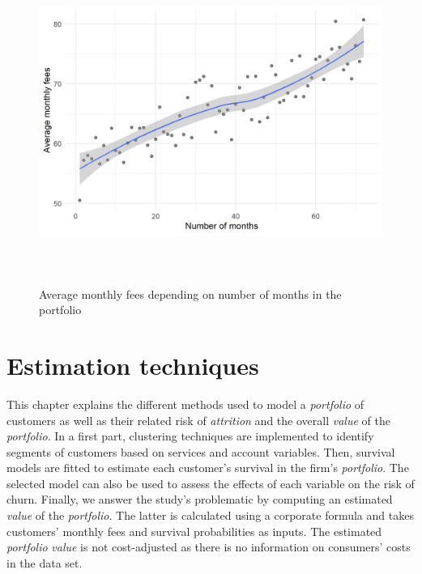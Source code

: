 \documentclass[
]{book}
\begin{document}
\begin{figure}

{\centering \includegraphics[width=450pt,height=300pt]{./imgs/monthly_charges_dur} 

}

\caption{Average monthly fees depending on number of months in the portfolio}\label{fig:monthlychargesdur}
\end{figure}

\hypertarget{estimation}{%
\chapter{Estimation techniques}\label{estimation}}

This chapter explains the different methods used to model a \emph{portfolio} of customers as well as their related risk of \emph{attrition} and the overall \emph{value} of the \emph{portfolio}. In a first part, clustering techniques are implemented to identify segments of customers based on services and account variables. Then, survival models are fitted to estimate each customer's survival in the firm's \emph{portfolio}. The selected model can also be used to assess the effects of each variable on the risk of churn. Finally, we answer the study's problematic by computing an estimated \emph{value} of the \emph{portfolio}. The latter is calculated using a corporate formula and takes customers' monthly fees and survival probabilities as inputs. The estimated \emph{portfolio} \emph{value} is not cost-adjusted as there is no information on consumers' costs in the data set.
\end{document}
